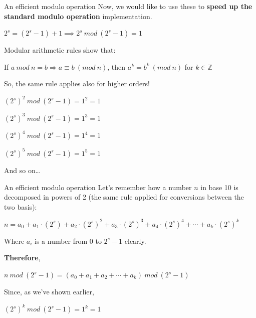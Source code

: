 \documentclass[aspectratio=1610,10.5pt]{beamer} %
\begin{document}
\begin{frame}{An efficient modulo operation}
    Now, we would like to use these to \textbf{speed up the standard modulo operation} implementation.

    \bigskip

    $2^s = (2^s - 1) + 1 \implies 2^s\ mod\ (2^s - 1) = 1$

    \bigskip

    Modular arithmetic rules show that:

    \smallskip

    If $a\ mod\ n = b \Rightarrow a \equiv b\ (mod\ n)$, then $a^k = b^k\ (mod\ n)$ for $k \in \mathbb{Z}$

    \medskip

    So, the same rule applies also for higher orders!

    \smallskip

    $(2^s)^2\ mod\ (2^s - 1) = 1^2 = 1$

    \smallskip

    $(2^s)^3\ mod\ (2^s - 1) = 1^3 = 1$

    \smallskip

    $(2^s)^4\ mod\ (2^s - 1) = 1^4 = 1$

    \smallskip

    $(2^s)^5\ mod\ (2^s - 1) = 1^5 = 1$

    \bigskip

    And so on\ldots
\end{frame}

\begin{frame}{An efficient modulo operation}
    Let's remember how a number $n$ in base 10 is decomposed in powers of 2 (the same rule applied for conversions between the two basis):

    \bigskip

    $n = a_0 + a_1 \cdot (2^s) + a_2 \cdot (2^s)^2 + a_3 \cdot (2^s)^3 + a_4 \cdot (2^s)^4 + \cdots + a_k \cdot (2^s)^k$

    \smallskip

    Where $a_i$ is a number from 0 to $2^s - 1$ clearly.

    \bigskip

    \textbf{Therefore},

    \smallskip

    $n\ mod\ (2^s-1) = (a_0 + a_1 + a_2 + \cdots + a_k)\ mod\ (2^s-1)$

    \smallskip

    Since, as we've shown earlier,

    \smallskip

    $(2^s)^k\ mod\ (2^s - 1) = 1^k = 1$
\end{frame}
\end{document}
